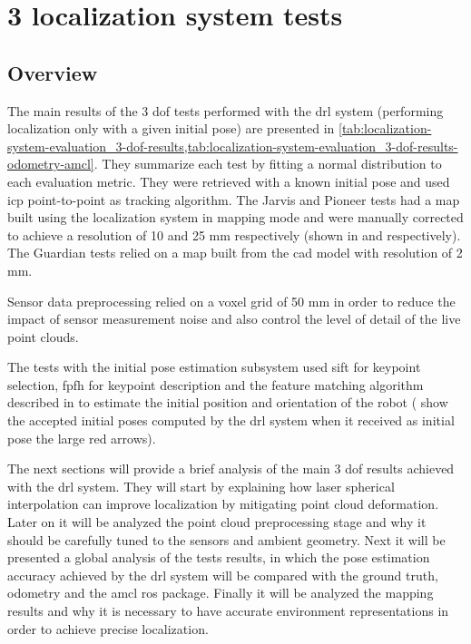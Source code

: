 \section{3  localization system tests}\label{sec:planar-localization-system-tests}


\subsection{Overview}

The main results of the 3 \gls{dof} tests performed with the \gls{drl} system (performing localization only with a given initial pose) are presented in \cref{tab:localization-system-evaluation_3-dof-results,tab:localization-system-evaluation_3-dof-results-odometry-amcl}. They summarize each test by fitting a normal distribution to each evaluation metric. They were retrieved with a known initial pose and used \gls{icp} point-to-point as tracking algorithm. The Jarvis and Pioneer tests had a map built using the localization system in mapping mode and were manually corrected to achieve a resolution of 10 and 25 mm respectively (shown in  and  respectively). The Guardian tests relied on a map built from the \gls{cad} model with resolution of 2 mm.

Sensor data preprocessing relied on a voxel grid of 50 mm in order to reduce the impact of sensor measurement noise and also control the level of detail of the live point clouds.

The tests with the initial pose estimation subsystem used \gls{sift} for keypoint selection, \gls{fpfh} for keypoint description and the feature matching algorithm described in  to estimate the initial position and orientation of the robot ( show the accepted initial poses computed by the \gls{drl} system when it received as initial pose the large red arrows).

The next sections will provide a brief analysis of the main 3 \gls{dof} results achieved with the \gls{drl} system. They will start by explaining how laser spherical interpolation can improve localization by mitigating point cloud deformation. Later on it will be analyzed the point cloud preprocessing stage and why it should be carefully tuned to the sensors and ambient geometry. Next it will be presented a global analysis of the tests results, in which the pose estimation accuracy achieved by the \gls{drl} system will be compared with the ground truth, odometry and the \gls{amcl} \gls{ros} package. Finally it will be analyzed the mapping results and why it is necessary to have accurate environment representations in order to achieve precise localization.


